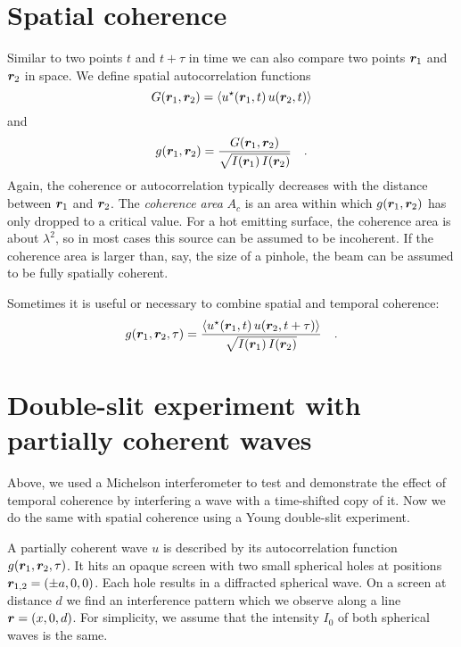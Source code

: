 \section{Spatial coherence}


Similar to two points $t$ and $t + \tau$ in time we can also compare two points $\boldsymbol{r}_1$ and $\boldsymbol{r}_2$ in space. We define spatial autocorrelation functions
\begin{equation}
    G(\boldsymbol{r}_1, \boldsymbol{r}_2) = \braket{u^\star(\boldsymbol{r}_1,t) \,  u(\boldsymbol{r}_2, t)} \label{eq:7:G_space}
\end{equation}
and
\begin{equation}
    g(\boldsymbol{r}_1, \boldsymbol{r}_2) = \frac{  G(\boldsymbol{r}_1, \boldsymbol{r}_2)}{\sqrt{I(\boldsymbol{r}_1) \, I(\boldsymbol{r}_2)}} \quad .
\end{equation}
Again, the coherence or autocorrelation typically decreases with the distance between $\boldsymbol{r}_1$ and $\boldsymbol{r}_2$. The \emph{coherence area} $A_c$ is an area within which $g(\boldsymbol{r}_1, \boldsymbol{r}_2)$ has only dropped to a critical value. For a hot emitting surface, the coherence area is about $\lambda^2$, so in most cases this source can be assumed to be incoherent. If the coherence area is larger than, say, the size of a pinhole, the beam can be assumed to be fully spatially coherent.

Sometimes it is useful or necessary to combine spatial and temporal coherence:
\begin{equation}
    g(\boldsymbol{r}_1, \boldsymbol{r}_2, \tau ) = \frac{ \braket{u^\star(\boldsymbol{r}_1,t) \,  u(\boldsymbol{r}_2, t + \tau)}}{\sqrt{I(\boldsymbol{r}_1) \, I(\boldsymbol{r}_2)}} \quad .
\end{equation}



\section{Double-slit experiment with partially coherent waves}

Above, we used a Michelson interferometer to test and demonstrate the effect of temporal coherence by interfering a wave with a time-shifted copy of it. Now we do the same with spatial coherence using a Young double-slit experiment.

A partially coherent wave $u$ is described by its autocorrelation function $g(\boldsymbol{r}_1, \boldsymbol{r}_2, \tau )$. It hits an opaque screen with two small spherical holes at positions $\boldsymbol{r}_{1,2} = (\pm a, 0,0)$. Each hole results in a diffracted spherical wave. On a screen at distance $d$ we find an interference pattern which we observe along a line $\boldsymbol{r} = (x, 0, d)$. For simplicity, we assume that the intensity $I_0$ of both spherical waves is the same.

